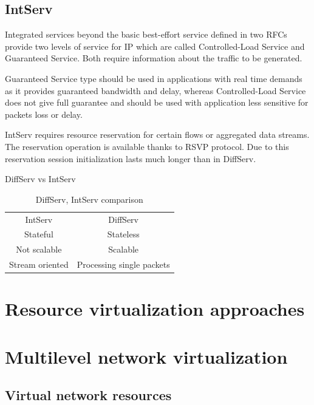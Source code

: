 \documentclass[11pt]{book}
\begin{document}
		\subsection{IntServ}
			
			Integrated services beyond the basic best-effort service defined in two RFCs provide two levels of 
			service for IP which are called Controlled-Load Service and Guaranteed Service. Both 
			require information about the traffic to be generated. 
			
			Guaranteed Service type should be used in applications with real time demands as it provides
			guaranteed bandwidth and delay, whereas Controlled-Load Service does not give full guarantee
			and should be used with application less sensitive for packets loss or delay.
			
			IntServ requires resource reservation for certain flows or aggregated data streams. The reservation 
			operation is available thanks to RSVP protocol. Due to this reservation session initialization 
			lasts much longer than in DiffServ.
			
		{DiffServ vs IntServ}
		
			\begin{table}[ht]
				\caption{DiffServ, IntServ comparison}
				\centering %
				\begin{tabular}{c c}
					\hline \hline
					IntServ & DiffServ \\
					Stateful & Stateless \\
					Not scalable & Scalable \\
					Stream oriented & Processing single packets \\
					\hline
				\end{tabular}
			\end{table}


    \section{Resource virtualization approaches}



    \section{Multilevel network virtualization}

      \subsection{Virtual network resources}
\end{document}
